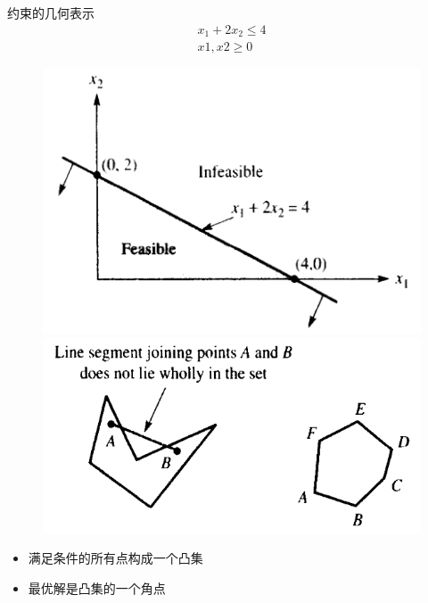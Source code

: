 \documentclass[mathserif, table]{beamer}
\begin{document}
\begin{frame}{约束的几何表示}
  \[
  \begin{array}{l}
    x_1 + 2x_2 \le 4\\
    x1, x2 \ge 0
  \end{array}
  \]
  \begin{figure}
    \includegraphics[width=.5\textwidth{}]{feasible.png}
    \includegraphics[width=.5\textwidth{}]{convex.png}
  \end{figure}  

  \begin{itemize}
  \item 满足条件的所有点构成一个凸集
  \item 最优解是凸集的一个角点
  \end{itemize}

\end{frame}
\end{document}
